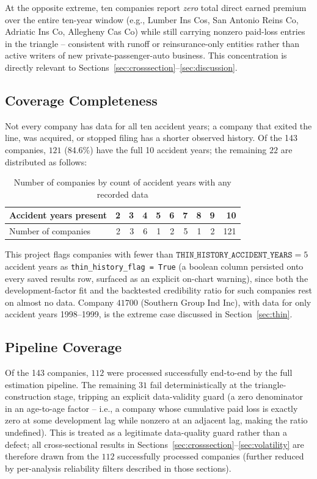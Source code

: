 \documentclass[11pt]{article}
\begin{document}
At the opposite extreme, ten companies report \emph{zero} total direct earned premium over the
entire ten-year window (e.g., Lumber Ins Cos, San Antonio Reins Co, Adriatic Ins Co, Allegheny Cas
Co) while still carrying nonzero paid-loss entries in the triangle -- consistent with runoff or
reinsurance-only entities rather than active writers of new private-passenger-auto business. This
concentration is directly relevant to Sections~\ref{sec:crosssection}--\ref{sec:discussion}.

\subsection{Coverage Completeness}

Not every company has data for all ten accident years; a company that exited the line, was
acquired, or stopped filing has a shorter observed history. Of the 143 companies, $121$ (84.6\%)
have the full 10 accident years; the remaining $22$ are distributed as follows:

\begin{table}[h]
\centering
\caption{Number of companies by count of accident years with any recorded data}
\begin{tabular}{lrrrrrrrrr}
\toprule
Accident years present & 2 & 3 & 4 & 5 & 6 & 7 & 8 & 9 & 10 \\
\midrule
Number of companies & 2 & 3 & 6 & 1 & 2 & 5 & 1 & 2 & 121 \\
\bottomrule
\end{tabular}
\end{table}

This project flags companies with fewer than $\texttt{THIN\_HISTORY\_ACCIDENT\_YEARS} = 5$
accident years as \texttt{thin\_history\_flag = True} (a boolean column persisted onto every
saved results row, surfaced as an explicit on-chart warning), since both the development-factor
fit and the backtested credibility ratio for such companies rest on almost no data. Company
$41700$ (Southern Group Ind Inc), with data for only accident years 1998--1999, is the extreme
case discussed in Section~\ref{sec:thin}.

\subsection{Pipeline Coverage}

Of the 143 companies, $112$ were processed successfully end-to-end by the full estimation
pipeline. The remaining $31$ fail deterministically at the triangle-construction stage, tripping
an explicit data-validity guard (a zero denominator in an age-to-age factor -- i.e., a company
whose cumulative paid loss is exactly zero at some development lag while nonzero at an adjacent
lag, making the ratio undefined). This is treated as a legitimate data-quality guard rather than a
defect; all cross-sectional results in Sections~\ref{sec:crosssection}--\ref{sec:volatility} are
therefore drawn from the $112$ successfully processed companies (further reduced by per-analysis
reliability filters described in those sections).
\end{document}
